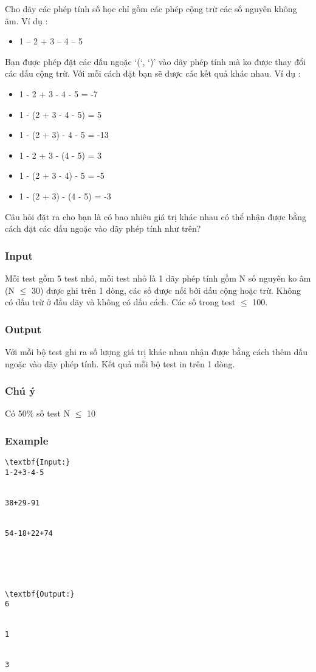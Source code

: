 



   Cho dãy các phép tính số học chỉ gồm các phép cộng trừ các số nguyên không âm. Ví dụ :  
\begin{itemize}
	\item     1 – 2 + 3 – 4 – 5   
\end{itemize}

   Bạn  được phép đặt các dấu ngoặc ‘(‘, ‘)’ vào dãy phép tính mà ko được thay  đổi các dấu cộng trừ. Với mỗi cách đặt bạn sẽ được các kết quả khác  nhau. Ví dụ :  
\begin{itemize}
	\item     1 - 2 + 3 - 4 - 5 = -7   
	\item     1 - (2 + 3 - 4 - 5) = 5   
	\item     1 - (2 + 3) - 4 - 5 = -13   
	\item     1 - 2 + 3 - (4 - 5) = 3   
	\item     1 - (2 + 3 - 4) - 5 = -5   
	\item     1 - (2 + 3) - (4 - 5) = -3   
\end{itemize}

   Câu hỏi đặt ra cho bạn là có bao nhiêu giá trị khác nhau có thể nhận  được bằng cách đặt các dấu ngoặc vào dãy phép tính như trên?  

\subsubsection{   Input  }

   Mỗi test gồm 5 test nhỏ, mỗi test nhỏ là 1 dãy phép tính gồm N số nguyên ko âm (N  $\le$  30) được ghi trên 1 dòng, các số được nối bởi dấu cộng hoặc trừ. Không có dấu trừ ở đầu dãy và không có dấu cách. Các số trong test  $\le$  100.  

\subsubsection{   Output  }

   Với mỗi bộ test ghi ra số lượng giá trị khác nhau nhận được bằng cách thêm dấu ngoặc vào dãy phép tính. Kết quả mỗi bộ test in trên 1 dòng.  

\subsubsection{   Chú ý  }

   Có 50\% số test N  $\le$  10  

\subsubsection{   Example  }
\begin{verbatim}
\textbf{Input:}
1-2+3-4-5


38+29-91


54-18+22+74





\textbf{Output:}
6


1


3 \end{verbatim}
